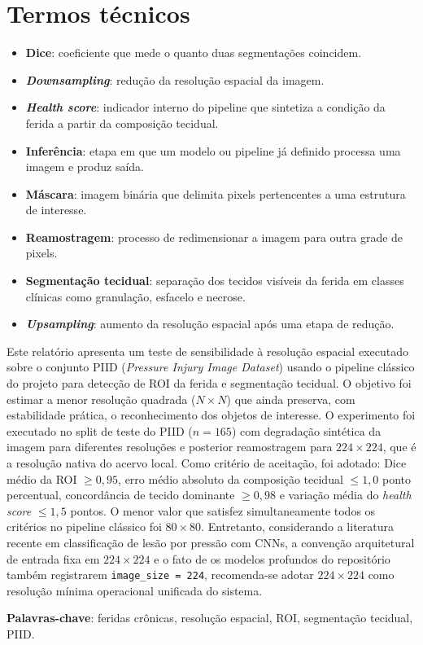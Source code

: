 \documentclass[
    12pt,
    openright,
    oneside,
    a4paper,
    chapter=TITLE,
    section=TITLE,
    brazil,
    sumario=tradicional,
    hidelinks
]{abntex2}
\begin{document}
\section*{Termos técnicos}
\begin{itemize}
    \item \textbf{Dice}: coeficiente que mede o quanto duas segmentações coincidem.
    \item \textbf{\textit{Downsampling}}: redução da resolução espacial da imagem.
    \item \textbf{\textit{Health score}}: indicador interno do pipeline que sintetiza a condição da ferida a partir da composição tecidual.
    \item \textbf{Inferência}: etapa em que um modelo ou pipeline já definido processa uma imagem e produz saída.
    \item \textbf{Máscara}: imagem binária que delimita pixels pertencentes a uma estrutura de interesse.
    \item \textbf{Reamostragem}: processo de redimensionar a imagem para outra grade de pixels.
    \item \textbf{Segmentação tecidual}: separação dos tecidos visíveis da ferida em classes clínicas como granulação, esfacelo e necrose.
    \item \textbf{\textit{Upsampling}}: aumento da resolução espacial após uma etapa de redução.
\end{itemize}

\cleardoublepage

\begin{resumo}
Este relatório apresenta um teste de sensibilidade à resolução espacial executado sobre o conjunto PIID (\textit{Pressure Injury Image Dataset}) usando o pipeline clássico do projeto para detecção de ROI da ferida e segmentação tecidual. O objetivo foi estimar a menor resolução quadrada (\(N \times N\)) que ainda preserva, com estabilidade prática, o reconhecimento dos objetos de interesse. O experimento foi executado no split de teste do PIID (\(n = 165\)) com degradação sintética da imagem para diferentes resoluções e posterior reamostragem para \(224 \times 224\), que é a resolução nativa do acervo local. Como critério de aceitação, foi adotado: Dice médio da ROI \(\geq 0{,}95\), erro médio absoluto da composição tecidual \(\leq 1{,}0\) ponto percentual, concordância de tecido dominante \(\geq 0{,}98\) e variação média do \textit{health score} \(\leq 1{,}5\) pontos. O menor valor que satisfez simultaneamente todos os critérios no pipeline clássico foi \(80 \times 80\). Entretanto, considerando a literatura recente em classificação de lesão por pressão com CNNs, a convenção arquitetural de entrada fixa em \(224 \times 224\) e o fato de os modelos profundos do repositório também registrarem \texttt{image\_size = 224}, recomenda-se adotar \(224 \times 224\) como resolução mínima operacional unificada do sistema.

\textbf{Palavras-chave}: feridas crônicas, resolução espacial, ROI, segmentação tecidual, PIID.
\end{resumo}
\end{document}
